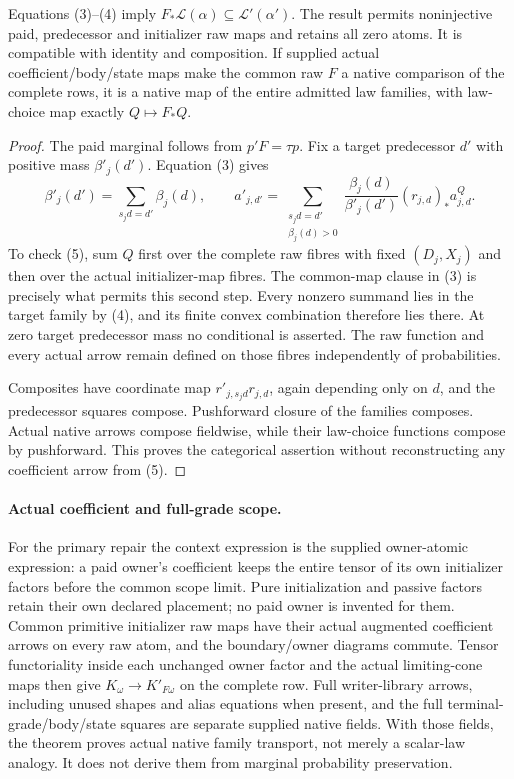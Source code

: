 \documentclass[11pt]{article}
\begin{document}
\begin{theorem}
Equations (3)--(4) imply $F_*\mathcal L(\alpha)\subseteq\mathcal L'(\alpha')$. The result permits noninjective paid, predecessor and initializer raw maps and retains all zero atoms. It is compatible with identity and composition. If supplied actual coefficient/body/state maps make the common raw $F$ a native comparison of the complete rows, it is a native map of the entire admitted law families, with law-choice map exactly $Q\mapsto F_*Q$.
\end{theorem}
\begin{proof}
The paid marginal follows from $p'F=\tau p$. Fix a target predecessor $d'$ with positive mass $\beta'_j(d')$. Equation (3) gives
\[
 \beta'_j(d')=\sum_{s_jd=d'}\beta_j(d),\qquad
 a'_{j,d'}=\sum_{\substack{s_jd=d'\\\beta_j(d)>0}}
 \frac{\beta_j(d)}{\beta'_j(d')}(r_{j,d})_*a^Q_{j,d}.    \tag{5}
\]
To check (5), sum $Q$ first over the complete raw fibres with fixed $(D_j,X_j)$ and then over the actual initializer-map fibres. The common-map clause in (3) is precisely what permits this second step. Every nonzero summand lies in the target family by (4), and its finite convex combination therefore lies there. At zero target predecessor mass no conditional is asserted. The raw function and every actual arrow remain defined on those fibres independently of probabilities.

Composites have coordinate map $r'_{j,s_jd}r_{j,d}$, again depending only on $d$, and the predecessor squares compose. Pushforward closure of the families composes. Actual native arrows compose fieldwise, while their law-choice functions compose by pushforward. This proves the categorical assertion without reconstructing any coefficient arrow from (5).\end{proof}

\paragraph{Actual coefficient and full-grade scope.}
For the primary repair the context expression is the supplied owner-atomic expression: a paid owner's coefficient keeps the entire tensor of its own initializer factors before the common scope limit. Pure initialization and passive factors retain their own declared placement; no paid owner is invented for them. Common primitive initializer raw maps have their actual augmented coefficient arrows on every raw atom, and the boundary/owner diagrams commute. Tensor functoriality inside each unchanged owner factor and the actual limiting-cone maps then give $K_\omega\to K'_{F\omega}$ on the complete row. Full writer-library arrows, including unused shapes and alias equations when present, and the full terminal-grade/body/state squares are separate supplied native fields. With those fields, the theorem proves actual native family transport, not merely a scalar-law analogy. It does not derive them from marginal probability preservation.
\end{document}
